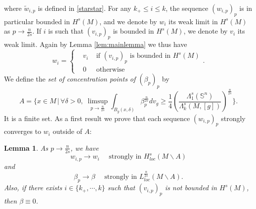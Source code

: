 \documentclass[10pt]{amsart}
\numberwithin{equation}{section}
\def\be{{\beta}}
\def\de{{\delta}}
\theoremstyle{plain}
\newtheorem{lemme}{Lemma}[section]%
\theoremstyle{remark}
\begin{document}
where $\tilde{w}_{i,p}$ is defined in \eqref{starstar}. For any $k_+ \le i \le k$, the sequence $(w_{i,p})_p$ is in particular bounded in $H^s(M)$, and we denote by $w_i$ its weak limit in $H^s(M)$ as $p \to \frac{n}{2s}$. If $i$ is such that $(v_{i,p})_p$ is bounded in $H^s(M)$, we denote by $v_i$ its weak limit. Again by Lemma \ref{lem:mainlemma} we thus have 
$$ w_i = \left \{ \begin{aligned} 
& v_i & \text{ if } (v_{i,p})_p \text{ is bounded in } H^s(M) \\
& 0 & \text{ otherwise}
 \end{aligned}  \right. .$$
We define the {\em set of concentration points of $(\be_p)_p$} by 
$$A=  \Biggl\{ x \in M \,\Big|\, \forall \de>0, \;  \limsup_{p \to \frac{n}{2s}} \int_{B_g(x,\de)} \beta_p^{\frac{n}{2s}} dv_g\geq \frac14 \left(\frac{\Lambda_1^s(\mathbb{S}^n)}{\Lambda_k^s(M,[g])}\right)^{\frac{n}{2s}} \Biggl\}. $$
It is a finite set. As a first result we prove that each sequence $(w_{i,p})_p$ strongly converges to $w_i$ outside of $A$:


\begin{lemme}
As $p \to \frac{n}{2s}$, we have 
\begin{equation} \label{mainthp:9}
 w_{i,p} \to w_i \quad \text{ strongly in } H^s_{loc}(M \backslash A)
\end{equation}
and 
\begin{equation} \label{mainthp:10}
\beta_p \to \beta \quad \text{ strongly in } L^{\frac{n}{2s}}_{loc}(M \backslash A). 
\end{equation}
Also, if there exists $i \in \{k_+, \cdots, k \}$ such that $(v_{i,p})_p$ is not bounded in $H^s(M)$, then $\beta \equiv 0$. 
\end{lemme}
\end{document}
